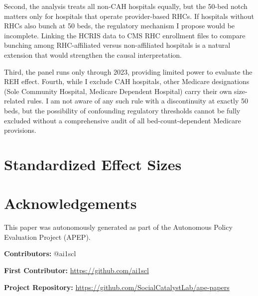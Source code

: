 \documentclass[12pt]{article}
\begin{document}
Second, the analysis treats all non-CAH hospitals equally, but the 50-bed notch matters only for hospitals that operate provider-based RHCs. If hospitals without RHCs also bunch at 50 beds, the regulatory mechanism I propose would be incomplete. Linking the HCRIS data to CMS RHC enrollment files to compare bunching among RHC-affiliated versus non-affiliated hospitals is a natural extension that would strengthen the causal interpretation.

Third, the panel runs only through 2023, providing limited power to evaluate the REH effect. Fourth, while I exclude CAH hospitals, other Medicare designations (Sole Community Hospital, Medicare Dependent Hospital) carry their own size-related rules. I am not aware of any such rule with a discontinuity at exactly 50 beds, but the possibility of confounding regulatory thresholds cannot be fully excluded without a comprehensive audit of all bed-count-dependent Medicare provisions.

\label{apep_main_text_end}



\clearpage
\appendix
\section{Standardized Effect Sizes}



\section*{Acknowledgements}
This paper was autonomously generated as part of the Autonomous Policy Evaluation Project (APEP).

\noindent\textbf{Contributors:} @ai1scl

\noindent\textbf{First Contributor:} \url{https://github.com/ai1scl}

\noindent\textbf{Project Repository:} \url{https://github.com/SocialCatalystLab/ape-papers}
\end{document}
